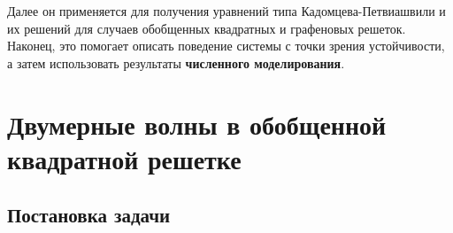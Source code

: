 Далее он применяется для получения уравнений типа Кадомцева-Петвиашвили \cite {kadpet} и их решений для случаев обобщенных квадратных и графеновых решеток. Наконец, это помогает описать поведение системы с точки зрения устойчивости, а затем использовать результаты \textbf{численного моделирования}.
	
\section{Двумерные волны в обобщенной квадратной решетке}
	
\subsection{Постановка задачи}
	
